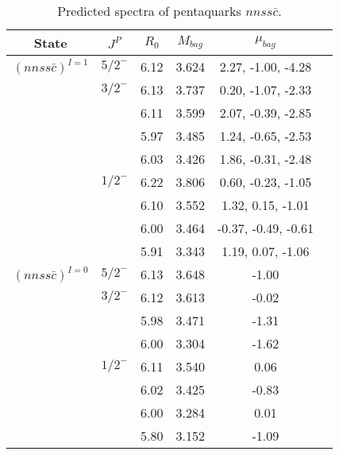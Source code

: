 \documentclass[prd,twocolumn,floatfix,nofootinbib]{revtex4}
\begin{document}
\renewcommand{\tabcolsep}{0.5cm}
\renewcommand{\arraystretch}{1.2}
\begin{table*}[!htbp]
    \caption{Predicted spectra of pentaquarks $nnss\bar{c}$.}
    \begin{tabular}{cccccc}
        \hline\hline
        {\rm State} &$J^{P}$ &$R_{0}$ &$M_{bag}$ &$\mu_{bag}$  \\ \hline
        ${(nnss\bar{c})}^{I=1}$
            &${5/2}^{-}$    &6.12   &3.624  &2.27, -1.00, -4.28     \\
            &${3/2}^{-}$    &6.13   &3.737  &0.20, -1.07, -2.33  \\
            &               &6.11   &3.599  &2.07, -0.39, -2.85  \\
            &               &5.97   &3.485  &1.24, -0.65, -2.53  \\
            &               &6.03   &3.426  &1.86, -0.31, -2.48  \\
            &${1/2}^{-}$    &6.22   &3.806  &0.60, -0.23, -1.05  \\
            &               &6.10   &3.552  &1.32, 0.15, -1.01  \\
            &               &6.00   &3.464  &-0.37, -0.49, -0.61  \\
            &               &5.91   &3.343  &1.19, 0.07, -1.06  \\
        ${(nnss\bar{c})}^{I=0}$
            &${5/2}^{-}$    &6.13   &3.648  &-1.00  \\
            &${3/2}^{-}$    &6.12   &3.613  &-0.02  \\
            &               &5.98   &3.471  &-1.31  \\
            &               &6.00   &3.304  &-1.62  \\
            &${1/2}^{-}$    &6.11   &3.540  &0.06  \\
            &               &6.02   &3.425  &-0.83  \\
            &               &6.00   &3.284  &0.01  \\
            &               &5.80   &3.152  &-1.09  \\
        \hline\hline
    \end{tabular}
\end{table*}
\end{document}
